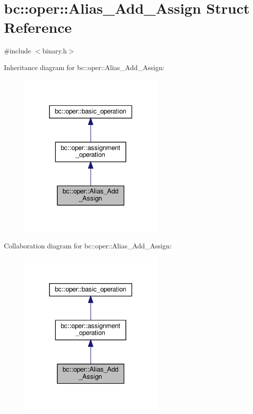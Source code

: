 \hypertarget{structbc_1_1oper_1_1Alias__Add__Assign}{}\section{bc\+:\+:oper\+:\+:Alias\+\_\+\+Add\+\_\+\+Assign Struct Reference}
\label{structbc_1_1oper_1_1Alias__Add__Assign}


{\ttfamily \#include $<$binary.\+h$>$}



Inheritance diagram for bc\+:\+:oper\+:\+:Alias\+\_\+\+Add\+\_\+\+Assign\+:\nopagebreak
\begin{figure}[H]
\begin{center}
\leavevmode
\includegraphics[width=206pt]{structbc_1_1oper_1_1Alias__Add__Assign__inherit__graph}
\end{center}
\end{figure}


Collaboration diagram for bc\+:\+:oper\+:\+:Alias\+\_\+\+Add\+\_\+\+Assign\+:\nopagebreak
\begin{figure}[H]
\begin{center}
\leavevmode
\includegraphics[width=206pt]{structbc_1_1oper_1_1Alias__Add__Assign__coll__graph}
\end{center}
\end{figure}

